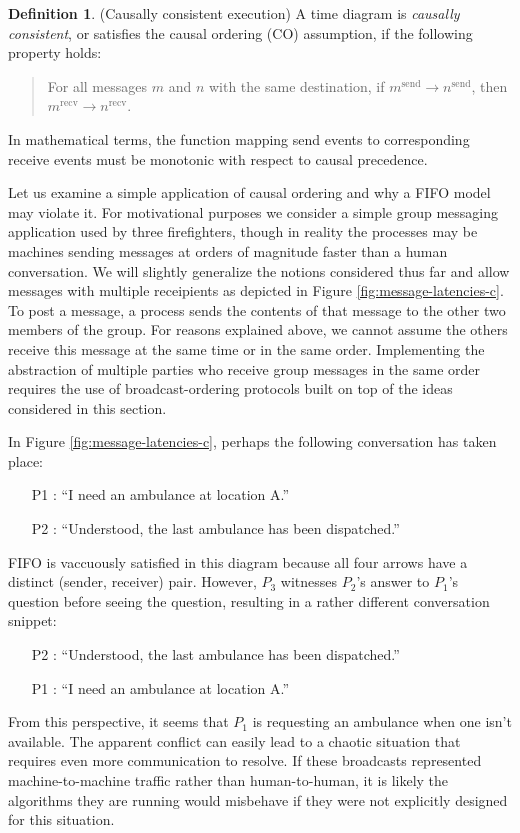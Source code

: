 \documentclass[]             %
{NASA}                       %
\theoremstyle{definition}
\newtheorem{definition}{Definition}[section]
\begin{document}
\begin{definition}(Causally consistent execution)
  A time diagram is \emph{causally consistent}, or satisfies the
  causal ordering (CO) assumption, if the following property holds:
  \begin{quote}
  For all messages $m$ and $n$ with the same destination, if
  $m^\textrm{send} \to n^\textrm{send}$, then $m^\textrm{recv} \to
  n^\textrm{recv}$.
  \end{quote}
  In mathematical terms, the function mapping send events to
  corresponding receive events must be monotonic with respect to
  causal precedence.
\end{definition}

Let us examine a simple application of causal ordering and why a FIFO
model may violate it. For motivational purposes we consider a simple
group messaging application used by three firefighters, though in
reality the processes may be machines sending messages at orders of
magnitude faster than a human conversation. We will slightly
generalize the notions considered thus far and allow messages with
multiple receipients as depicted in Figure
\ref{fig:message-latencies-c}. To post a message, a process sends the
contents of that message to the other two members of the group. For
reasons explained above, we cannot assume the others receive this
message at the same time or in the same order. Implementing the
abstraction of multiple parties who receive group messages in the same
order requires the use of broadcast-ordering protocols built on top of
the ideas considered in this section.

In Figure \ref{fig:message-latencies-c}, perhaps the following
conversation has taken place:
\begin{itemize}
\item [P1]: ``I need an ambulance at location A.''
\item [P2]: ``Understood, the last ambulance has been dispatched.''
\end{itemize}
FIFO is vaccuously satisfied in this diagram because all four arrows
have a distinct (sender, receiver) pair. However, $P_3$ witnesses
$P_2$'s answer to $P_1$'s question before seeing the question,
resulting in a rather different conversation snippet:
\begin{itemize}
\item [P2]: ``Understood, the last ambulance has been dispatched.''
\item [P1]: ``I need an ambulance at location A.''
\end{itemize}
From this perspective, it seems that $P_1$ is requesting an ambulance
when one isn't available. The apparent conflict can easily lead to a
chaotic situation that requires even more communication to resolve. If
these broadcasts represented machine-to-machine traffic rather than
human-to-human, it is likely the algorithms they are running would
misbehave if they were not explicitly designed for this situation.
\end{document}
